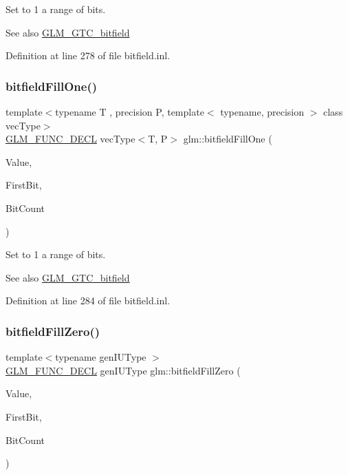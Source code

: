 Set to 1 a range of bits.

\begin{DoxySeeAlso}{See also}
\mbox{\hyperlink{group__gtc__bitfield}{G\+L\+M\+\_\+\+G\+T\+C\+\_\+bitfield}} 
\end{DoxySeeAlso}


Definition at line 278 of file bitfield.\+inl.

\mbox{\label{group__gtc__bitfield_gad789042e84e8292ae95dc1af856f2ad5}} 
\subsubsection{\texorpdfstring{bitfieldFillOne()}{bitfieldFillOne()}\hspace{0.1cm}{\footnotesize\ttfamily [2/2]}}
{\footnotesize\ttfamily template$<$typename T , precision P, template$<$ typename, precision $>$ class vec\+Type$>$ \\
\mbox{\hyperlink{setup_8hpp_ab2d052de21a70539923e9bcbf6e83a51}{G\+L\+M\+\_\+\+F\+U\+N\+C\+\_\+\+D\+E\+CL}} vec\+Type$<$T, P$>$ glm\+::bitfield\+Fill\+One (\begin{DoxyParamCaption}\item[{vec\+Type$<$ T, P $>$ const \&}]{Value,  }\item[{int}]{First\+Bit,  }\item[{int}]{Bit\+Count }\end{DoxyParamCaption})}

Set to 1 a range of bits.

\begin{DoxySeeAlso}{See also}
\mbox{\hyperlink{group__gtc__bitfield}{G\+L\+M\+\_\+\+G\+T\+C\+\_\+bitfield}} 
\end{DoxySeeAlso}


Definition at line 284 of file bitfield.\+inl.

\mbox{\label{group__gtc__bitfield_ga697b86998b7d74ee0a69d8e9f8819fee}} 
\subsubsection{\texorpdfstring{bitfieldFillZero()}{bitfieldFillZero()}\hspace{0.1cm}{\footnotesize\ttfamily [1/2]}}
{\footnotesize\ttfamily template$<$typename gen\+I\+U\+Type $>$ \\
\mbox{\hyperlink{setup_8hpp_ab2d052de21a70539923e9bcbf6e83a51}{G\+L\+M\+\_\+\+F\+U\+N\+C\+\_\+\+D\+E\+CL}} gen\+I\+U\+Type glm\+::bitfield\+Fill\+Zero (\begin{DoxyParamCaption}\item[{gen\+I\+U\+Type}]{Value,  }\item[{int}]{First\+Bit,  }\item[{int}]{Bit\+Count }\end{DoxyParamCaption})}


